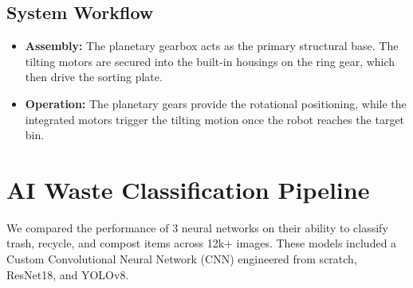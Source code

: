 \documentclass[12pt]{article}
\begin{document}
\subsection{System Workflow}

\begin{itemize}
    \item \textbf{Assembly:} The planetary gearbox acts as the primary structural base. The tilting motors are secured into the built-in housings on the ring gear, which then drive the sorting plate.
    \item \textbf{Operation:} The planetary gears provide the rotational positioning, while the integrated motors trigger the tilting motion once the robot reaches the target bin.
\end{itemize}


\section*{AI Waste Classification Pipeline}
We compared the performance of 3 neural networks on their ability to classify trash, recycle, and compost items across 12k+ images. These models included a Custom Convolutional Neural Network (CNN) engineered from scratch, ResNet18, and YOLOv8.
\end{document}
